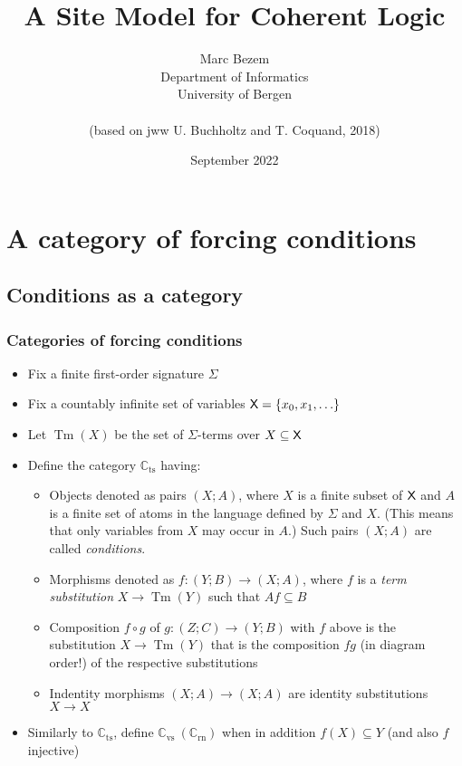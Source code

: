\documentclass[handout,11pt]{beamer}
\title{A Site Model for Coherent Logic}
\author{Marc Bezem\\
Department of Informatics\\
University of Bergen\\
\mbox{ }\\
(based on jww U. Buchholtz and T. Coquand, 2018)
}
\date{September 2022}
\newcommand{\set}[1]{\{#1\}}
\newcommand{\XX}{\mbox{\sf X}}
\newcommand*{\subvs}{_{\mathrm{vs}}}
\newcommand*{\subrn}{_{\mathrm{rn}}}
\newcommand*{\subts}{_{\mathrm{ts}}}
\newcommand{\Cvs}{\mathbb{C}\subvs}
\newcommand{\Crn}{\mathbb{C}\subrn}
\newcommand{\Cts}{\mathbb{C}\subts}
\DeclareMathOperator{\Tm}{Tm}
\begin{document}
\frame{\titlepage}

\section[Outline]{}
\frame{\tableofcontents}


\section{A category of forcing conditions}

\subsection{Conditions as a category}

\begin{frame}
\frametitle{Categories of forcing conditions}
 \begin{itemize}[<+->]   %
   \item Fix a finite first-order signature $\Sigma$
   \item Fix a countably infinite set of variables $\XX=\set{x_0,x_1,\ldots}$
   \item Let $\Tm(X)$ be the set of $\Sigma$-terms over $X \subseteq \XX$    
   \item Define the category $\Cts$ having:
    \begin{itemize}[<+->]   %
    \item Objects denoted as pairs $(X;A)$,
    where $X$ is a finite subset of $\XX$ and $A$ is a finite set
    of atoms in the language defined by $\Sigma$ and $X$.
    (This means that only variables from $X$ may occur in $A$.)
    Such pairs $(X;A)$ are called \emph{conditions}.
    \item Morphisms denoted as $f : (Y;B) \to (X;A)$, where $f$ is a 
    \emph{term substitution} $X \to \Tm(Y)$ such that $Af \subseteq B$
    \item Composition $f\circ g$ of $g : (Z;C) \to (Y;B)$ with $f$ above is
    the substitution $X \to \Tm(Y)$ that is the composition $fg$
    (in diagram order!) of the respective substitutions
    \item Indentity morphisms $(X;A)\to(X;A)$ are identity 
    substitutions $X\to X$
    \end{itemize}
    \item Similarly to $\Cts$, define $\Cvs~(\Crn)$ when 
    in addition $f(X)\subseteq Y$ (and also $f$ injective)
 \end{itemize}
\end{frame}
\end{document}
